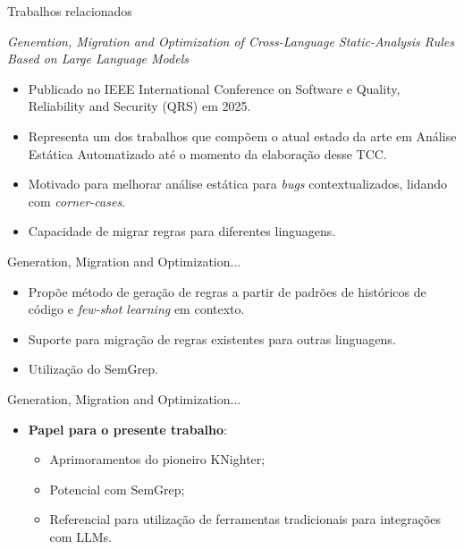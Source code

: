 \documentclass[
    aspectratio=169,   %
    12pt,
    brazil
]{beamer}
\newcommand{\minhaspaginas}{}
\begin{document}
\renewcommand{\minhaspaginas}{\small 38 - 40}
\begin{frame}{Trabalhos relacionados}
 \begin{block}{\textit{Generation, Migration and Optimization of Cross-Language Static-Analysis Rules Based on Large Language Models} \cite{hou2025generation}}
    \begin{itemize}
      \item  Publicado no IEEE International Conference on Software e Quality, Reliability and Security (QRS) em 2025.
      \item Representa um dos trabalhos que compõem o atual estado da arte em Análise Estática Automatizado até o momento da elaboração desse TCC.
      \item Motivado para melhorar análise estática para \textit{bugs} contextualizados, lidando com \textit{corner-cases}.
      \item Capacidade de migrar regras para diferentes linguagens.
    \end{itemize}
  \end{block}
\end{frame}

\begin{frame}{Generation, Migration and Optimization...}
  \begin{itemize}
    \item Propõe método de geração de regras a partir de padrões de históricos de código e \textit{few-shot learning} em contexto.
    \item Suporte para migração de regras existentes para outras linguagens.
    \item Utilização do SemGrep.
  \end{itemize}
\end{frame}

\begin{frame}{Generation, Migration and Optimization...}
  \begin{itemize}
    \item \textbf{Papel para o presente trabalho}:
      \begin{itemize}
        \item Aprimoramentos do pioneiro KNighter;
        \item Potencial com SemGrep;
        \item Referencial para utilização de ferramentas tradicionais para integrações com LLMs.
      \end{itemize}
  \end{itemize}
\end{frame}
\end{document}
